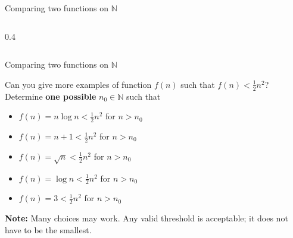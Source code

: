 \documentclass[aspectratio=169]{beamer}
\begin{document}
\begin{frame}{Comparing two functions on $\mathbb{N}$}
\begin{columns}[T]
\begin{column}{0.4\textwidth}
      \begin{center}

      \end{center}
    \end{column}
  \end{columns}
\end{frame}














\begin{frame}{Comparing two functions on $\mathbb{N}$}
  \begin{block}{Can you give more examples of function $f(n)$ such that $f(n)<\frac{1}{2}n^2$?}
   Determine \textbf{one possible} $n_0\in \mathbb{N}$ such that
   \begin{itemize}
       \item $f(n)=n\log n < \frac{1}{2}n^2$ for $n> n_0$
       \item $f(n)=n+1< \frac{1}{2}n^2$ for $n> n_0$
       \item $f(n)=\sqrt{n}< \frac{1}{2}n^2$ for $n> n_0$
       \item $f(n)=\log n< \frac{1}{2}n^2$ for $n> n_0$
       \item $f(n)=3< \frac{1}{2}n^2$ for $n> n_0$
   \end{itemize}
   {\small \textbf{Note:} Many choices may work. Any valid threshold is acceptable; it does not have to be the smallest.}
  \end{block}
\end{frame}
\end{document}
